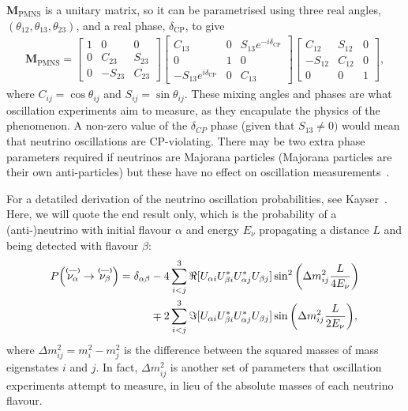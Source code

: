 \documentclass[aps,pra,12pt,notitlepage,tightenlines]{revtex4-1}
\newcommand\matr[1]{\bm{#1}}
\newcommand\barparen[1]{\overset{\textbf{\fontsize{5pt}{5pt}\selectfont(---)}}{#1}}
\begin{document}
$\matr{M}_\mathrm{PMNS}$ is a unitary matrix, so it can be parametrised using three real angles, $(\theta_{12}, \theta_{13}, \theta_{23})$, and a real phase, $\delta_\mathrm{CP}$, to give
\begin{gather}
 \matr{M}_\mathrm{PMNS} = 
 \begin{bmatrix}
 1 & 0 & 0 \\
 0 & C_{23} & S_{23} \\
 0 & -S_{23} & C_{23}
 \end{bmatrix}
 \begin{bmatrix}
 C_{13} & 0 & S_{13}e^{-i\delta_\mathrm{CP}} \\
 0 & 1 & 0 \\
 -S_{13}e^{i\delta_\mathrm{CP}} & 0 & C_{13}
 \end{bmatrix}
 \begin{bmatrix}
 C_{12} & S_{12} & 0 \\
 -S_{12} & C_{12} & 0 \\
 0 & 0 & 1
 \end{bmatrix}
 ,
\end{gather}
where $C_{ij} = \cos\theta_{ij}$ and $S_{ij} = \sin\theta_{ij}$. These mixing angles and phases are what oscillation experiments aim to measure, as they encapulate the physics of the phenomenon. A non-zero value of the $\delta_{CP}$ phase (given that $S_{13}\neq 0)$ would mean that neutrino oscillations are CP-violating. There may be two extra phase parameters required if neutrinos are Majorana particles (Majorana particles are their own anti-particles) but these have no effect on oscillation measurements~\cite{Kayser:2005cd}.

For a detatiled derivation of the neutrino oscillation probabilities, see Kayser~\cite{Kayser:2011jn}. Here, we will quote the end result only, which is the probability of a \mbox{(anti-)neutrino} with initial flavour $\alpha$ and energy $E_\nu$ propagating a distance $L$ and being detected with flavour $\beta$:
\begin{align}
\label{eq:p}
P\Big(\barparen{\nu_\alpha}\rightarrow\barparen{\nu_\beta}\Big) = \delta_{\alpha\beta}&-4\sum^3_{i<j}\Re[U_{\alpha i}U_{\beta i}^*U_{\alpha j}^*U_{\beta j}]\sin^2\bigg(\Delta m^2_{ij}\frac{L}{4E_\nu}\bigg) \notag \\
& \mp 2\sum^3_{i<j}\Im[U_{\alpha i}U_{\beta i}^*U_{\alpha j}^*U_{\beta j}]\sin\bigg(\Delta m^2_{ij}\frac{L}{2E_\nu}\bigg),
\end{align}
where $\Delta m^2_{ij} = m^2_i - m^2_j$ is the difference between the squared masses of mass eigenstates $i$ and $j$. In fact, $\Delta m^2_{ij}$ is another set of parameters that oscillation experiments attempt to measure, in lieu of the absolute masses of each neutrino flavour.
\end{document}
